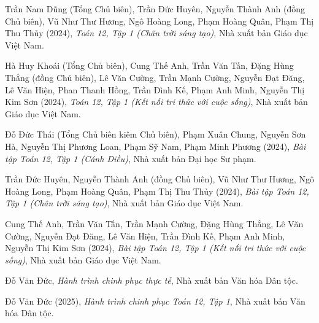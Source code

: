 \documentclass[12pt,a4paper,oneside]{book}
\theoremstyle{theorem}
\theoremstyle{definition}
\begin{document}
    \noindent [2] Trần Nam Dũng (Tổng Chủ biên), Trần Đức Huyên, Nguyễn Thành Anh (đồng Chủ biên), Vũ Như Thư Hương, Ngô Hoàng Long, Phạm Hoàng Quân, Phạm Thị Thu Thủy (2024), \textit{Toán 12, Tập 1 (Chân trời sáng tạo)}, Nhà xuất bản Giáo dục Việt Nam.
    
    \noindent [3] Hà Huy Khoái (Tổng Chủ biên), Cung Thế Anh, Trần Văn Tấn, Đặng Hùng Thắng (đồng Chủ biên), Lê Văn Cường, Trần Mạnh Cường, Nguyễn Đạt Đăng, Lê Văn Hiện, Phan Thanh Hồng, Trần Đình Kế, Phạm Anh Minh, Nguyễn Thị Kim Sơn (2024), \textit{Toán 12, Tập 1 (Kết nối tri thức với cuộc sống)}, Nhà xuất bản Giáo dục Việt Nam.
    
    \noindent [4] Đỗ Đức Thái (Tổng Chủ biên kiêm Chủ biên), Phạm Xuân Chung, Nguyễn Sơn Hà, Nguyễn Thị Phương Loan, Phạm Sỹ Nam, Phạm Minh Phương (2024), \textit{Bài tập Toán 12, Tập 1 (Cánh Diều)}, Nhà xuất bản Đại học Sư phạm.
    
    \noindent [5] Trần Đức Huyên, Nguyễn Thành Anh (đồng Chủ biên), Vũ Như Thư Hương, Ngô Hoàng Long, Phạm Hoàng Quân, Phạm Thị Thu Thủy (2024), \textit{Bài tập Toán 12, Tập 1 (Chân trời sáng tạo)}, Nhà xuất bản Giáo dục Việt Nam.
    
    \noindent [6] Cung Thế Anh, Trần Văn Tấn, Trần Mạnh Cường, Đặng Hùng Thắng, Lê Văn Cường, Nguyễn Đạt Đăng, Lê Văn Hiện, Trần Đình Kế, Phạm Anh Minh, Nguyễn Thị Kim Sơn (2024), \textit{Bài tập Toán 12, Tập 1 (Kết nối tri thức với cuộc sống)}, Nhà xuất bản Giáo dục Việt Nam.
    
    \noindent [7] Đỗ Văn Đức, \textit{Hành trình chinh phục thực tế}, Nhà xuất bản Văn hóa Dân tộc.

    \noindent [8] Đỗ Văn Đức (2025), \textit{Hành trình chinh phục Toán 12, Tập 1}, Nhà xuất bản Văn hóa Dân tộc.

        
\end{document}
